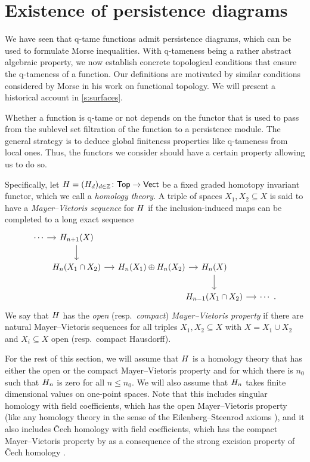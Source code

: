 
\section{Existence of persistence diagrams} \label{s:connectivity}

We have seen that q-tame functions admit persistence diagrams, which can be used to formulate Morse inequalities.
With q-tameness being a rather abstract algebraic property, we now establish concrete topological conditions that ensure the q-tameness of a function.
Our definitions are motivated by similar conditions considered by Morse in his work on functional topology.
We will present a historical account in \cref{s:surfaces}.

Whether a function is q-tame or not depends on the functor that is used to pass from the sublevel set filtration of the function to a persistence module.
The general strategy is to deduce global finiteness properties like q-tameness from local ones.
Thus, the functors we consider should have a certain property allowing us to do so.

Specifically, let $H = (H_d)_{d \in \mathbb{Z}} \colon \mathsf{Top} \to \mathsf{Vect}$ be a fixed graded homotopy invariant functor, which we call a \emph{homology theory}.
A triple of spaces $X_{1}, X_{2} \subseteq X$ is said to have a \emph{Mayer--Vietoris sequence} for $H$ if the inclusion-induced maps can be completed to a long exact sequence
\begin{equation*}
\begin{tikzcd}[column sep = small]
\cdots \arrow[r] &[-10pt] \H_{n+1}(X) \arrow[d] & &[-20pt] & \\
& \H_{n}(X_{1} \cap X_{2}) \arrow[r] &
\H_{n}(X_{1}) \oplus \H_{n}(X_{2}) \arrow[r] &
\H_{n}(X) \arrow[d] \\ & & &
\H_{n-1}(X_{1} \cap X_{2}) \arrow[r] &
\cdots \ .
\end{tikzcd}
\end{equation*}
We say that $H$ has the \emph{open} (resp.\@\ \emph{compact}) \emph{Mayer--Vietoris property} if there are natural Mayer--Vietoris sequences for all triples $X_{1}, X_{2} \subseteq X$ with $X = X_1 \cup X_2$ and $X_i \subseteq X$ open (resp.\@\ compact Hausdorff).

For the rest of this section, we will assume that $H$ is a homology theory that has either the open or the compact Mayer--Vietoris property and for which there is $n_0$ such that $H_{n}$ is zero for all $n \leq n_0$.
We will also assume that $H_{n}$ takes finite dimensional values on one-point spaces.
Note that this includes singular homology with field coefficients, which has the open Mayer--Vietoris property (like any homology theory in the sense of the Eilenberg--Steenrod axioms \cite[Chapter I]{Eilenberg.1952}), and it also includes \v{C}ech homology with field coefficients, which has the compact Mayer--Vietoris property by \cite[Theorem 10.7.2]{tomDieck.2008} as a consequence of the strong excision property of \v{C}ech homology \cite[Theorem X.5.4]{Eilenberg.1952}.

